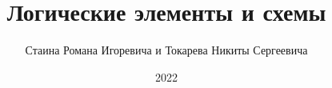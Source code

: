 \documentclass[spec, och, labwork]{shiza}
\begin{document}
\chair{}

\title{Логические элементы и схемы}






\author{Стаина Романа Игоревича и Токарева Никиты Сергеевича}








\date{2022}

\maketitle

\end{document}
